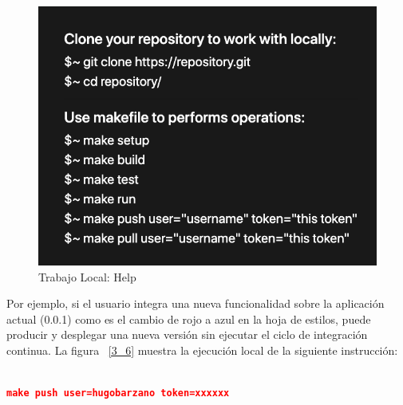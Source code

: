 \documentclass[a4paper,11pt]{book}
\begin{document}
   \begin{figure}[H]
\centering
\includegraphics[scale=0.5]{imagenes/casouso_a/3_4.png}
\caption{   Trabajo Local: Help}
\label{3_4}
\end{figure}

Por ejemplo, si el usuario integra una nueva funcionalidad sobre la aplicación actual (0.0.1) como es el cambio de rojo a azul en la hoja de estilos, puede producir y desplegar una nueva versión sin ejecutar el ciclo de integración continua. La figura ~\ref{3_6} muestra la ejecución local de la siguiente  instrucción:
~\\
~\\

\begin{lstlisting}[language=json,firstnumber=1]
make push user=hugobarzano token=xxxxxx
\end{lstlisting}

~\\
~\\
~\\
~\\
\end{document}
